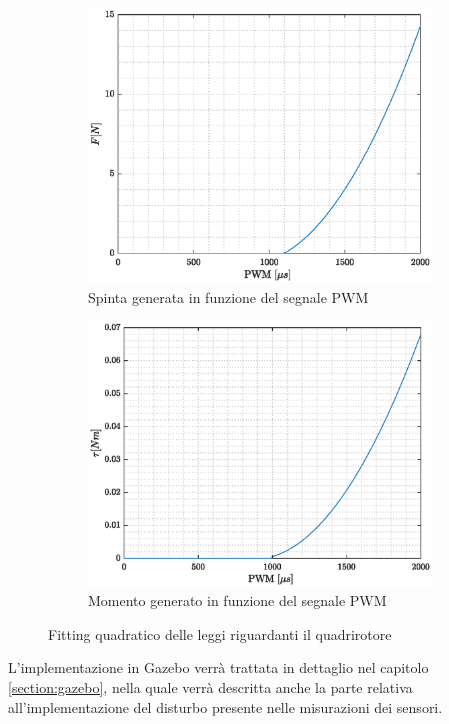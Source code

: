 \begin{figure}
	\centering
	\begin{subfigure}{0.45\textwidth}
		\centering
		\includegraphics[width=1\textwidth]{SistemaQuadrirotore/Figure/ForzaPWM}
		\caption{Spinta generata in funzione del segnale PWM}
	\end{subfigure}
	\hfill
	\begin{subfigure}{0.45\textwidth}
		\centering
		\includegraphics[width=1\textwidth]{SistemaQuadrirotore/Figure/MomentoPWM}
		\caption{Momento generato in funzione del segnale PWM}
	\end{subfigure}
	\caption{Fitting quadratico delle leggi riguardanti il quadrirotore}
	\label{fig:pwmTM}
\end{figure}
 
L'implementazione in Gazebo verrà trattata in dettaglio nel capitolo \ref{section:gazebo}, nella quale verrà descritta anche la parte relativa all'implementazione del disturbo presente nelle misurazioni dei sensori.